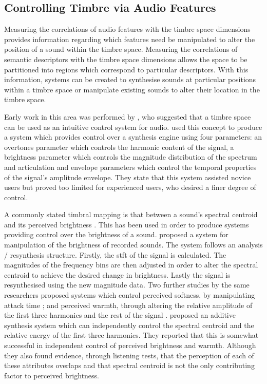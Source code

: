 	\subsection{Controlling Timbre via Audio Features}
	\label{sec:Timbre-Control-TimbreSpaces}
		Measuring the correlations of audio features with the timbre space dimensions provides information
		regarding which features need be manipulated to alter the position of a sound within the timbre space.
		Measuring the correlations of semantic descriptors with the timbre space dimensions allows the space to be
		partitioned into regions which correspond to particular descriptors. With this information, systems can be
		created to synthesise sounds at particular positions within a timbre space or manipulate existing sounds to
		alter their location in the timbre space.

		Early work in this area was performed by \citet{wessel1979timbre}, who suggested that a timbre space can be
		used as an intuitive control system for audio. \citet{vertegaal1994isee} used this concept to produce a
		system which provides control over a synthesis engine using four parameters: an overtones parameter which
		controls the harmonic content of the signal, a brightness parameter which controls the magnitude
		distribution of the spectrum and articulation and envelope parameters which control the temporal properties
		of the signal's amplitude envelope. They state that this system assisted novice users but proved too
		limited for experienced users, who desired a finer degree of control.

		A commonly stated timbral mapping is that between a sound's spectral centroid and its perceived brightness
		\citep{schubert2006does}. This has been used in order to produce systems providing control over the
		brightness of a sound. \citet{williams2007perceptually} proposed a system for manipulation of the
		brightness of recorded sounds. The system follows an analysis / resynthesis structure. Firstly, the
		\acrfull{stft} of the signal is calculated. The magnitudes of the frequency bins are then adjusted in order
		to alter the spectral centroid to achieve the desired change in brightness. Lastly the signal is
		resynthesised using the new magnitude data.  Two further studies by the same researchers proposed systems
		which control perceived softness, by manipulating attack time \citep{williams2009perceptually}; and
		perceived warmth, through altering the relative amplitude of the first three harmonics and the rest of the
		signal \citep{williams2010perceptually}. \citet{zacharakis2011an} proposed an additive synthesis system
		which can independently control the spectral centroid and the relative energy of the first three harmonics.
		They reported that this is somewhat successful in independent control of perceived brightness and warmth.
		Although they also found evidence, through listening tests, that the perception of each of these attributes
		overlaps and that spectral centroid is not the only contributing factor to perceived brightness.

